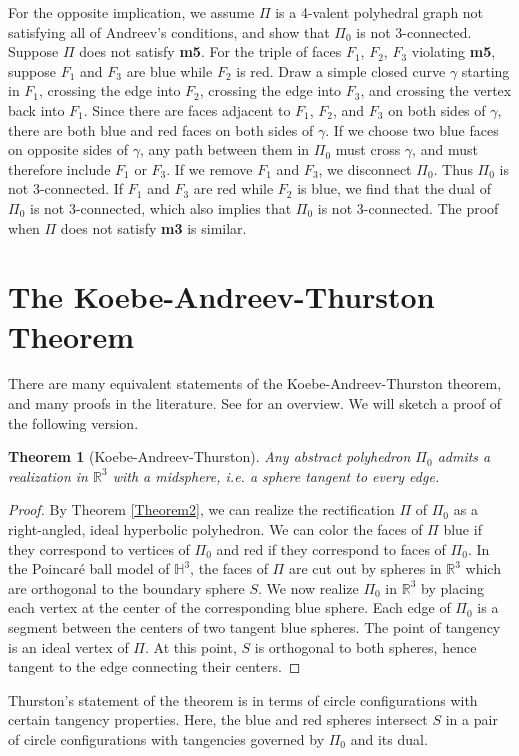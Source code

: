 \documentclass[11pt,letterpaper]{amsart}
\newtheorem{theorem}{Theorem}
\newcommand{\R}{\mathbb{R}}
\begin{document}
For the opposite implication, we assume $\Pi$ is a 4-valent polyhedral graph not satisfying all of Andreev's conditions, and show that $\Pi_0$ is not 3-connected. Suppose $\Pi$ does not satisfy \textbf{m5}. For the triple of faces $F_1$, $F_2$, $F_3$ violating \textbf{m5}, suppose $F_1$ and $F_3$ are blue while $F_2$ is red. Draw a simple closed curve $\gamma$ starting in $F_1$, crossing the edge into $F_2$, crossing the edge into $F_3$, and crossing the vertex back into $F_1$. Since there are faces adjacent to $F_1$, $F_2$, and $F_3$ on both sides of $\gamma$, there are both blue and red faces on both sides of $\gamma$. If we choose two blue faces on opposite sides of $\gamma$, any path between them in $\Pi_0$ must cross $\gamma$, and must therefore include $F_1$ or $F_3$. If we remove $F_1$ and $F_3$, we disconnect $\Pi_0$. Thus $\Pi_0$ is not 3-connected. If $F_1$ and $F_3$ are red while $F_2$ is blue, we find that the dual of $\Pi_0$ is not 3-connected, which also implies that $\Pi_0$ is not 3-connected. The proof when $\Pi$ does not satisfy \textbf{m3} is similar.


\section{The Koebe-Andreev-Thurston Theorem} 

There are many equivalent statements of the Koebe-Andreev-Thurston theorem, and many proofs in the literature. See \cite{Stephenson} for an overview. We will sketch a proof of the following version.

\begin{theorem}[Koebe-Andreev-Thurston] \label{Theorem3}
Any abstract polyhedron $\Pi_0$ admits a realization in $\R^3$ with a midsphere, i.e. a sphere tangent to every edge.
\end{theorem} 

\begin{proof}
By Theorem \ref{Theorem2}, we can realize the rectification $\Pi$ of $\Pi_0$ as a right-angled, ideal hyperbolic polyhedron. We can color the faces of $\Pi$ blue if they correspond to vertices of $\Pi_0$ and red if they correspond to faces of $\Pi_0$. In the Poincar\'{e} ball model of $\mathbb{H}^3$, the faces of $\Pi$ are cut out by spheres in $\R^3$ which are orthogonal to the boundary sphere $S$. We now realize $\Pi_0$ in $\R^3$ by placing each vertex at the center of the corresponding blue sphere. Each edge of $\Pi_0$ is a segment between the centers of two tangent blue spheres. The point of tangency is an ideal vertex of $\Pi$. At this point, $S$ is orthogonal to both spheres, hence tangent to the edge connecting their centers. 
\end{proof}

Thurston's statement of the theorem is in terms of circle configurations with certain tangency properties. Here, the blue and red spheres intersect $S$ in a pair of circle configurations with tangencies governed by $\Pi_0$ and its dual.

\printbibliography
\end{document}

